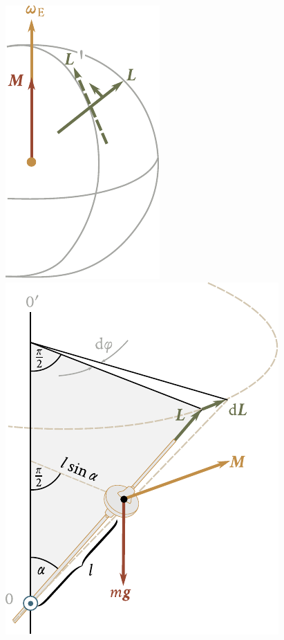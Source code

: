 \begin{figure}[t]
	\begin{minipage}[t]{0.4\linewidth}
		\begin{center}
			\includegraphics[scale=0.9]{figures/ch_05/fig_5_28.pdf}
			\caption[]{}
			\label{fig:5_28}
		\end{center}
	\end{minipage}
	\hspace{-0.05cm}
	\begin{minipage}[t]{0.6\linewidth}
		\begin{center}
			\includegraphics[scale=0.95]{figures/ch_05/fig_5_29.pdf}
			\caption[]{}
			\label{fig:5_29}
		\end{center}
	\end{minipage}
	\vspace{-0.7cm}
\end{figure}

